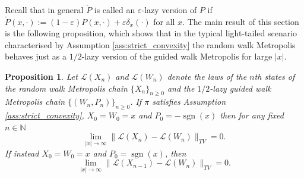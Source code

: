 \documentclass{article}
\theoremstyle{definition}
\theoremstyle{plain}
\newtheorem{proposition}[definition]{Proposition}
\begin{document}
Recall that in general $\check{P}$ is called an $\varepsilon$-lazy version of $P$ if $\check{P}(x,\cdot) := (1-\varepsilon)P(x,\cdot) + \varepsilon \delta_x(\cdot)$ for all $x$.  The main result of this section is the following proposition, which shows that in the typical light-tailed scenario characterised by Assumption \ref{ass:strict_convexity} the random walk Metropolis behaves just as a $1/2$-lazy version of the guided walk Metropolis for large $|x|$.  

\begin{proposition}
\label{prop:nstep_coupling}
Let $\mathcal{L}(X_n)$ and $\mathcal{L}(W_n)$ denote the laws of the $n$th states of the random walk Metropolis chain $\{X_n\}_{n \geq 0}$ and the $1/2$-lazy guided walk Metropolis chain $\{(W_n,P_n)\}_{n\geq 0}$.  If $\pi$ satisfies Assumption \ref{ass:strict_convexity}, $X_0 = W_0 = x$ and $P_0 = -\operatorname{sgn}(x)$ then for any fixed $n \in \mathbb{N}$
\begin{equation*}
\lim_{|x|\to \infty} \|\mathcal{L}(X_n) - \mathcal{L}(W_n)\|_{TV} = 0.
\end{equation*}
If instead $X_0 = W_0 = x$ and $P_0 = \operatorname{sgn}(x)$, then
\begin{equation*}
\lim_{|x|\to \infty} \|\mathcal{L}(X_{n-1}) - \mathcal{L}(W_n)\|_{TV} = 0.
\end{equation*}
\end{proposition}
\end{document}
